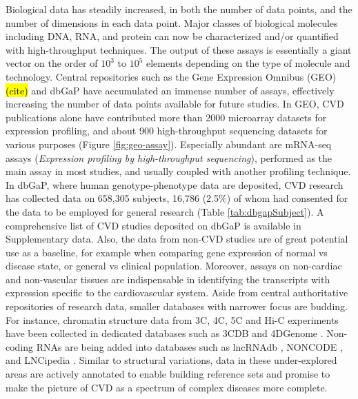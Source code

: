 \documentclass[letter]{bioinfo}
\begin{document}
	Biological data has steadily increased, in both the number of data points, and the number of dimensions in each data point.
	Major classes of biological molecules including DNA, RNA, and protein can now be characterized and/or quantified with high-throughput techniques. The output of these assays is essentially a giant vector on the order of $10^3$ to $10^5$ elements depending on the type of molecule and technology. Central repositories such as the Gene Expression Omnibus (GEO) \hl{(cite)} and dbGaP have accumulated an immense number of assays, effectively increasing the number of data points available for future studies.
	In GEO, CVD publications alone have contributed more than 2000 microarray datasets for expression profiling, and about 900 high-throughput sequencing datasets for various purposes (Figure \ref{fig:geo-assay}). Especially abundant are mRNA-seq assays (\textit{Expression profiling by high-throughput sequencing}), performed as the main assay in most studies, and usually coupled with another profiling technique. In dbGaP, where human genotype-phenotype data are deposited, CVD research has collected data on 658,305 subjects, 16,786 (2.5\%) of whom had consented for the data to be employed for general research (Table \ref{tab:dbgapSubject}). A comprehensive list of CVD studies deposited on dbGaP is available in Supplementary data. Also, the data from non-CVD studies are of great potential use as a baseline, for example when comparing gene expression of normal vs disease state, or general vs clinical population. Moreover, assays on non-cardiac and non-vascular tissues are indispensable in identifying the transcripts with expression specific to the cardiovascular system.  Aside from central authoritative repositories of research data, smaller databases with narrower focus are budding. For instance, chromatin structure data from 3C, 4C, 5C and Hi-C experiments have been collected in dedicated databases such as 3CDB \citep{Yun:2016:3CDB} and 4DGenome \citep{Teng:2015:4DGenome}. Non-coding RNAs are being added into databases such as lncRNAdb \citep{Quek:2015:lncRNAdb}, NONCODE \citep{Fang:2018:NONCODEV5}, and LNCipedia \citep{Volders:2018:LNCipedia}.  Similar to structural variations, data in these under-explored areas are actively annotated to enable building reference sets and promise to make the picture of CVD as a spectrum of complex diseases more complete.
\end{document}
